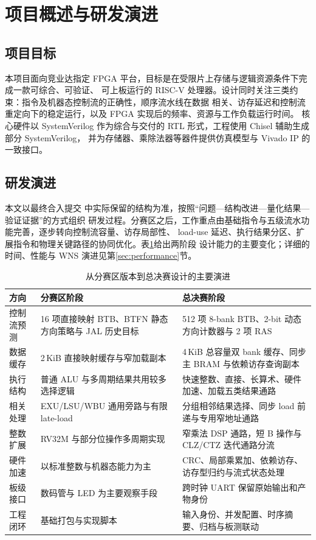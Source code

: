 \section{项目概述与研发演进}\label{sec:overview}

\subsection{项目目标}

本项目面向竞业达指定 FPGA 平台，目标是在受限片上存储与逻辑资源条件下完成一款可综合、可验证、
可上板运行的 RISC-V 处理器。设计同时关注三类约束：指令及机器态控制流的正确性，顺序流水线在数据
相关、访存延迟和控制流重定向下的稳定运行，以及 FPGA 实现后的频率、资源与工作负载运行时间。
核心硬件以 SystemVerilog 作为综合与交付的 RTL 形式，工程使用 Chisel 辅助生成部分 SystemVerilog，
并为存储器、乘除法器等器件提供仿真模型与 Vivado IP 的一致接口。

\subsection{研发演进}

本文以最终合入提交  中实际保留的结构为准，按照“问题---结构改进---量化结果---验证证据”的方式组织
研发过程。分赛区之后，工作重点由基础指令与五级流水功能完善，逐步转向控制流容量、访存局部性、
load-use 延迟、执行结果分区、扩展指令和物理关键路径的协同优化。表\ref{tab:evolution}给出两阶段
设计能力的主要变化；详细的时间、性能与 WNS 演进见第\ref{sec:performance}节。

\begin{table}[H]
\centering
\caption{从分赛区版本到总决赛设计的主要演进}\label{tab:evolution}
\fontsize{7.2}{8.6}\selectfont
\setlength{\tabcolsep}{3pt}
\begin{tabular*}{\linewidth}{@{\extracolsep{\fill}}lll@{}}
\toprule
\textbf{方向}&\textbf{分赛区阶段}&\textbf{总决赛阶段}\\\midrule
控制流预测&16 项直接映射 BTB、BTFN 静态方向策略与 JAL 历史目标&512 项 8-bank BTB、2-bit 动态方向计数器与 2 项 RAS\\
数据缓存&2\,KiB 直接映射缓存与窄加载副本&4\,KiB 总容量双 bank 缓存、同步主 BRAM 与依赖访存查询副本\\
执行结构&普通 ALU 与多周期结果共用较多选择逻辑&快速整数、直接、长算术、硬件加速、加载五类结果通路\\
相关处理&EXU/LSU/WBU 通用旁路与有限 late-load&分组相邻结果选择、同步 load 前递与专用窄地址通路\\
整数扩展&RV32M 与部分位操作多周期实现&窄乘法 DSP 通路，短 B 操作与 CLZ/CTZ 迭代通路分流\\
硬件加速&以标准整数与机器态能力为主&CRC、局部乘累加、依赖访存、访存型归约与流式状态处理\\
板级接口&数码管与 LED 为主要观察手段&跨时钟 UART 保留原始输出和产物身份\\
工程闭环&基础打包与实现脚本&输入身份、并发配置、时序摘要、归档与板测联动\\
\bottomrule
\end{tabular*}
\end{table}

